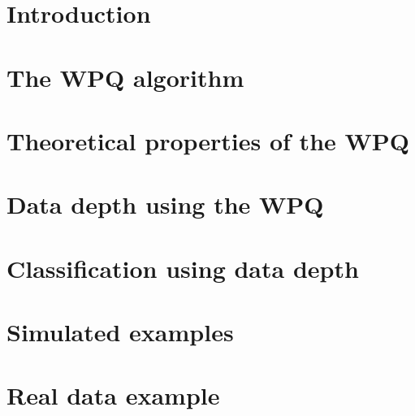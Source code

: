 \documentclass[twoside,leqno,twocolumn]{article}
\begin{document}
 
 \section{Introduction}
 
 \section{The WPQ algorithm}
 
 \section{Theoretical properties of the WPQ}
 
 \section{Data depth using the WPQ}
 
 \section{Classification using data depth}
 
 \section{Simulated examples}
 
 \section{Real data example}
\end{document}
